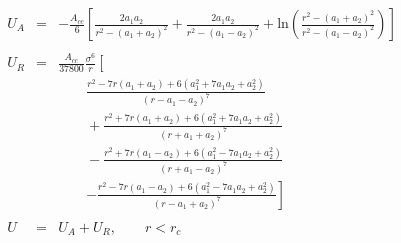 


\begin{eqnarray}
U_A &=& - \frac{A_{cc}}{6} \left[
	\frac{2 a_1 a_2}{r^2-\left(a_1+a_2\right)^2}
	+ \frac{2 a_1 a_2}{r^2 - \left(a_1 - a_2\right)^2}
	+ \mathrm{ln}
				\left( 
					\frac{r^2-\left(a_1+a_2\right)^2}{r^2-\left(a_1-a_2\right)^2}
				\right)
\right] \nonumber \\
\nonumber \\
U_R &=& \frac{A_{cc}}{37800}  \frac{\sigma^6}{r}
\left[ \frac{}{} \right. \nonumber \\
	&&\qquad		\frac{r^2-7r\left(a_1+a_2\right)+6\left(a_1^2+7a_1a_2+a_2^2\right)}
					{\left(r-a_1-a_2\right)^7} \nonumber \\
	&&\qquad		+\frac{r^2+7r\left(a_1+a_2\right)+6\left(a_1^2+7a_1a_2+a_2^2\right)}
					{\left(r+a_1+a_2\right)^7} \nonumber \\
	&&\qquad		-\frac{r^2+7r\left(a_1-a_2\right)+6\left(a_1^2-7a_1a_2+a_2^2\right)}
					{\left(r+a_1-a_2\right)^7} \nonumber \\
	&&\qquad	\left.	-\frac{r^2-7r\left(a_1-a_2\right)+6\left(a_1^2-7a_1a_2+a_2^2\right)}
					{\left(r-a_1+a_2\right)^7}
\right] \nonumber \\
\nonumber \\
U &=& U_A + U_R, \qquad r < r_c \nonumber
\end{eqnarray}



